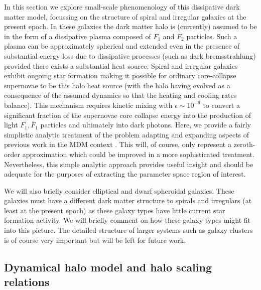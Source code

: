 \documentclass[12pt]{article}
\begin{document}
{{In this section we explore small-scale phenomenology of this dissipative
dark matter model, focussing on the structure of spiral and irregular
galaxies
at the present epoch.
In these galaxies the dark matter halo is (currently) assumed to be in
the form of a dissipative plasma
composed of $F_1$ and $F_2$ particles. Such a plasma can be
approximately spherical and extended even in the presence
of substantial energy loss due to dissipative processes (such as dark
bremsstrahlung) provided there exists
a substantial heat source.
Spiral and irregular galaxies exhibit ongoing star formation making it
possible for ordinary core-collapse
supernovae to be this halo heat source (with the halo having evolved as
a consequence of the assumed dynamics so that the heating and cooling
rates balance). 
This mechanism requires kinetic mixing with $\epsilon \sim 10^{-9}$ to
convert a significant fraction of the supernovae core collapse
energy into the production of light $F_1,\bar F_1$ particles and
ultimately into dark photons.
Here, we provide a fairly simplistic analytic treatment of the problem
adapting and expanding aspects of previous work in the MDM 
context \cite{spheroidal,depth4}.
This will, of course, only represent a zeroth-order
approximation which could be improved in a more sophisticated treatment.
Nevertheless, this simple analytic approach provides useful 
insight and should be adequate for the purposes of extracting
the parameter space region of interest.


We will also briefly consider
elliptical and dwarf spheroidal galaxies.
These galaxies must have a different dark matter structure
to spirals and irregulars (at least at the present epoch)
as these galaxy types have little current star formation activity. We
will briefly comment on how these 
galaxy types might
fit into this picture.
The detailed structure of larger systems such as galaxy clusters is of
course very important but will
be left for future work.


\subsection{Dynamical halo model and halo scaling relations}


}}
\end{document}
